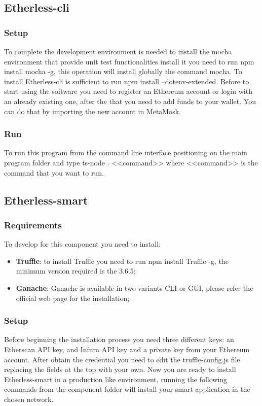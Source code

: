 \subsection{Etherless-cli}
\subsubsection{Setup}
To complete the development environment is needed to install the mocha environment that provide unit test functionalities
install it you need to run npm install mocha -g, this operation will install globally the command mocha.
To install Etherless-cli is sufficient to run npm install --dotenv-extended.
Before to start using the software you need to register an Ethereum account or login with an already existing one, after the that you need to add funds to your wallet.
You can do that by importing the new account in MetaMask.
\subsubsection{Run}
To run this program from the command line interface positioning on the main program folder
and type ts-node . <<command>> where <<command>> is the command that you want to run.
\subsection{Etherless-smart}
\subsubsection{Requirements}
To develop for this component you need to install:
\begin{itemize}
    \item \textbf{Truffle}: to install Truffle you need to run npm install Truffle -g, the minimum version required is the 3.6.5;
    \item \textbf{Ganache}: Ganache is available in two variants CLI or GUI, please refer the official web page for the installation;
\end{itemize}

\subsubsection{Setup}
Before beginning the installation process you need three different keys: an Etherscan API key, and Infura API key and a private key from your Ethereum account.
After obtain the credential you need to edit the truffle-config.js file replacing the fields at the top with your own.
Now you are ready to install Etherless-smart in a production like environment, running the following commands from the component folder will install your smart application in the chosen network.

